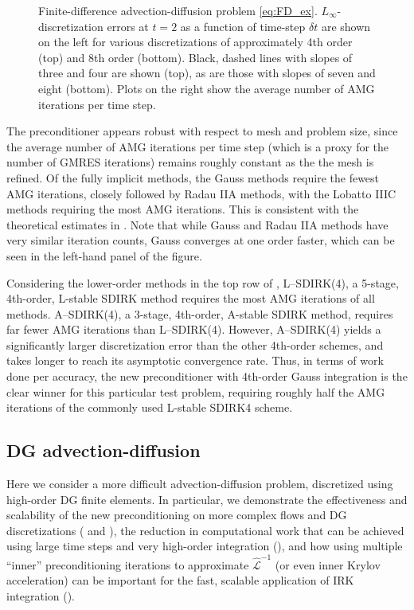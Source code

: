 \documentclass[review]{siamart}
\begin{document}
\begin{figure}[!htb]
{}
\caption{Finite-difference advection-diffusion problem \eqref{eq:FD_ex}. $L_{\infty}$-discretization errors at $t = 2$ as a function of time-step $\delta t$ are shown on
the left for various discretizations of approximately 4th order (top) and 8th order (bottom). Black, dashed lines with slopes of three and four are shown (top), as are those with slopes of seven and eight (bottom). Plots on the right show the average number of AMG iterations per time step.
\label{fig:FD_ex}
}
\end{figure}

The preconditioner appears robust with respect to mesh and problem size, since
the average number of AMG iterations per time step (which is a proxy for the
number of GMRES iterations) remains roughly constant as the the mesh is refined.
Of the fully implicit methods, the Gauss methods require the fewest AMG iterations, closely
followed by Radau IIA methods, with the Lobatto IIIC methods requiring the most
AMG iterations. This is
consistent with the theoretical estimates in .
Note that while Gauss and Radau IIA methods have very similar
iteration counts, Gauss converges at one order faster, which can be seen in the
left-hand panel of the figure.

Considering the lower-order methods in the top
row of , L--SDIRK(4), a 5-stage, 4th-order, L-stable SDIRK
method requires the most AMG iterations of all methods. A--SDIRK(4), a 3-stage,
4th-order, A-stable SDIRK method, requires far fewer AMG iterations than
L--SDIRK(4). However, A--SDIRK(4) yields a significantly larger discretization
error than the other 4th-order schemes, and takes longer to reach its asymptotic
convergence rate. Thus, in terms of work done per accuracy, the new
preconditioner with 4th-order Gauss integration is the clear winner
for this particular test problem, requiring roughly half the AMG iterations
of the commonly used L-stable SDIRK4 scheme.

\subsection{DG advection-diffusion}\label{sec:numerics:dg}

Here we consider a more difficult advection-diffusion problem, discretized
using high-order DG finite elements. In particular, we demonstrate
the effectiveness and scalability of the new preconditioning on more complex flows and
DG discretizations ( and ),
the reduction in computational work that can be achieved using large time steps and
very high-order integration (), and how
using multiple ``inner'' preconditioning iterations to approximate $\widehat{\mathcal{L}}^{-1}$
(or even inner Krylov acceleration) can be important for the fast, scalable
application of IRK integration ().
\end{document}
